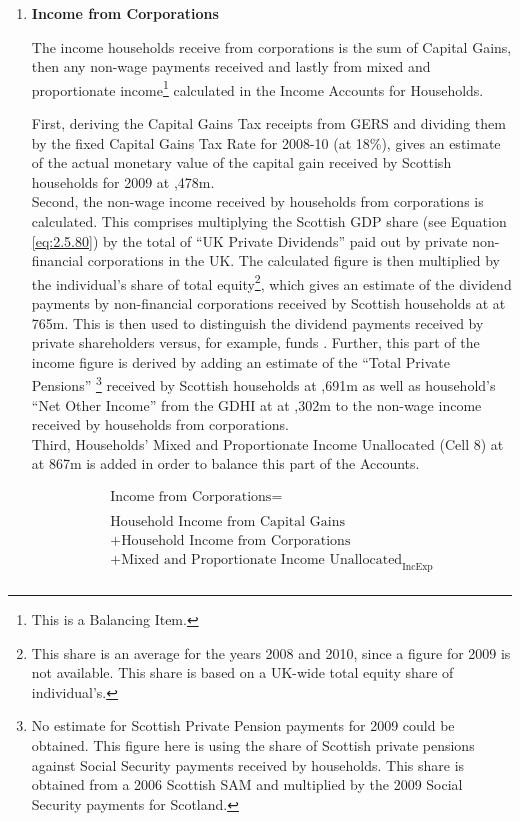 \begin{enumerate}
\item \textbf {Income from Corporations}

The income households receive from corporations is the sum of Capital Gains, then any non-wage payments received and lastly from mixed and proportionate income\footnote{This is a Balancing Item.} calculated in the Income Accounts for Households.

\bigskip

First, deriving the Capital Gains Tax receipts from GERS and dividing them by the fixed  Capital Gains Tax Rate for 2008-10 (at 18\%), gives an estimate of the actual monetary value of the capital gain received by Scottish households for 2009 at ,478m\cite{ScotGov2013b,HMRC2013}.\\
Second, the non-wage income received by households from corporations is calculated. This comprises multiplying the Scottish GDP share (see Equation \ref{eq:2.5.80}) by the total of ``UK Private Dividends'' paid out by private non-financial corporations in the UK. The calculated figure is then multiplied by the individual's share of total equity\footnote{This share is an average for the years 2008 and 2010, since a figure for 2009 is not available. This share is based on a UK-wide total equity share of individual's.}, which gives an estimate of the dividend payments by non-financial corporations received by Scottish households at at \textsterling765m. This is then used to distinguish the dividend payments received by private shareholders versus, for example, funds \cite{ONS2011c}. Further, this part of the income figure is derived by adding an estimate of the ``Total Private Pensions'' \footnote{No estimate for Scottish Private Pension payments for 2009 could be obtained. This figure here is using the share of Scottish private pensions against Social Security payments received by households. This share is obtained from a 2006 Scottish SAM \cite{Hermannsson2010a} and multiplied by the 2009 Social Security payments for Scotland.} received by Scottish households at ,691m as well as household's ``Net Other Income'' from the GDHI at at ,302m to the non-wage income received by households from corporations\cite{ONS2012}.\\
Third, Households' Mixed and Proportionate Income Unallocated (Cell 8) at at \textsterling867m is added in order to balance this part of the Accounts.  


\begin{equation}
\begin{split}
\text{Income from Corporations} =  \\ \\
\text{Household Income from Capital Gains}\\
+\text{Household Income from Corporations}\\
+\text{Mixed and Proportionate Income Unallocated}_\text{IncExp}\\
\end{split} \label{eq:2.5.4}
\end{equation}


\end{enumerate}

